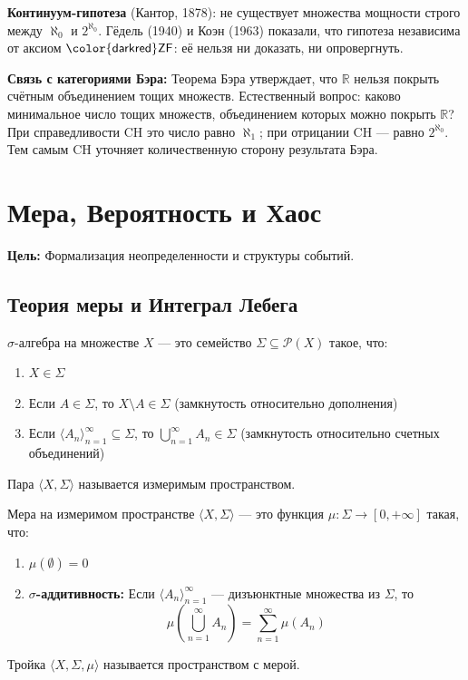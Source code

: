 \documentclass[11pt, a4paper]{extarticle}
\newcommand{\si}{\sigma}
\newcommand{\Si}{\Sigma}
\newcommand{\Pcal}{{\mathcal P}}
\newcommand{\R}{{\mathbb R}}
\newcommand{\ZF}{\ifmmode \mathsf{\color{darkred}ZF}\else ${\mathsf{\color{darkred}ZF}}$\fi\xspace}
\begin{document}
\begin{remark}
\textbf{Континуум-гипотеза} (Кантор, 1878): не существует множества мощности строго между $\aleph_0$ и $2^{\aleph_0}$. Гёдель (1940) и Коэн (1963) показали, что гипотеза независима от аксиом \ZF: её нельзя ни доказать, ни опровергнуть.

\textbf{Связь с категориями Бэра:} Теорема Бэра утверждает, что $\R$ нельзя покрыть счётным объединением тощих множеств. Естественный вопрос: каково минимальное число тощих множеств, объединением которых можно покрыть $\R$? При справедливости CH это число равно $\aleph_1$; при отрицании CH --- равно $2^{\aleph_0}$. Тем самым CH уточняет количественную сторону результата Бэра.
\end{remark}

\section{Мера, Вероятность и Хаос}
\textbf{Цель:} Формализация неопределенности и структуры событий.

\subsection{Теория меры и Интеграл Лебега}

\begin{definition}[$\si$-алгебра]
$\si$-алгебра на множестве $X$ --- это семейство $\Si \subseteq \Pcal(X)$ такое, что:
\begin{enumerate}
    \item $X \in \Si$
    \item Если $A \in \Si$, то $X \setminus A \in \Si$ (замкнутость относительно дополнения)
    \item Если $\langle A_n \rangle_{n=1}^\infty \subseteq \Si$, то $\bigcup_{n=1}^\infty A_n \in \Si$ (замкнутость относительно счетных объединений)
\end{enumerate}
Пара $\langle X, \Si \rangle$ называется измеримым пространством.
\end{definition}

\begin{definition}[Мера]
Мера на измеримом пространстве $\langle X, \Si \rangle$ --- это функция $\mu: \Si \to [0, +\infty]$ такая, что:
\begin{enumerate}
    \item $\mu(\emptyset) = 0$
    \item \textbf{$\si$-аддитивность:} Если $\langle A_n \rangle_{n=1}^\infty$ --- дизъюнктные множества из $\Si$, то
    $$\mu\left(\bigcup_{n=1}^\infty A_n\right) = \sum_{n=1}^\infty \mu(A_n)$$
\end{enumerate}
Тройка $\langle X, \Si, \mu \rangle$ называется пространством с мерой.
\end{definition}
\end{document}
